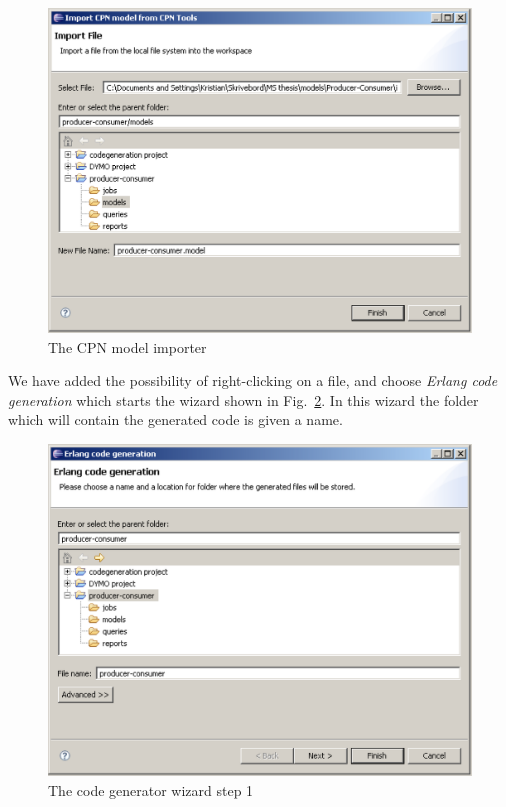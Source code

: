 \begin{figure}[h!]
\centering
\includegraphics[scale=0.2]{techniques_and_tool/graphics/importcpn.eps}
\caption{The CPN model importer}
\label{fig:importcpn}
\end{figure}

We have added the possibility of right-clicking on a  file, and choose \emph{Erlang code generation} which starts the wizard shown in Fig.~\ref{fig:cg1}. In this wizard the folder which will contain the generated code is given a name.

\begin{figure}[b!]
\centering
\includegraphics[scale=0.2]{techniques_and_tool/graphics/cg1.eps}
\caption{The code generator wizard step 1}
\label{fig:cg1}
\end{figure}

